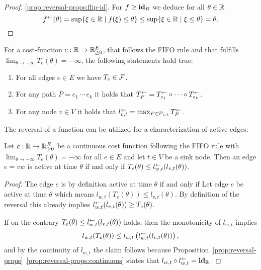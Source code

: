 \begin{proof}
    \ref{prop:reversal-props:flip-id}.
    For $f\geq \mathbf{id}_R$ we deduce for all $\theta\in\mathbb{R}$ \[
        f^{\leftarrow}(\theta) = \sup\{ \xi\in\mathbb{R} \mid f(\xi) \leq \theta \}
        \leq \sup\{\xi\in\mathbb{R} \mid \xi \leq \theta \} = \theta. \qedhere
    \]
\end{proof}

\begin{corollary}
    For a cost-function $c:\mathbb{R}\rightarrow\mathbb{R}_{\geq0}^E$, that follows the FIFO rule and that fulfills $\lim_{\theta\to-\infty} T_e(\theta) = -\infty$, the following statements hold true:
    \begin{enumerate}[label=(\roman*)]
        \item For all edges $e\in E$ we have $T_e \in \mathcal{F}$.
        \item\label{prop:reversal-props:paths} For any path $P=e_1\,\cdots \,e_k$ it holds that $T_P^{\leftarrow} = T_{e_1}^{\leftarrow} \circ \cdots \circ T_{e_k}^{\leftarrow}$.
        \item For any node $v\in V$ it holds that $l_{v,t}^{\leftarrow} = \max_{P\in\mathcal{P}_{v,t}} T_P^{\leftarrow}$.
    \end{enumerate}
\end{corollary}

The reversal of a function can be utilized for a characterization of active edges:

\begin{lemma}\label{lem:characterization-active-edges}
    Let $c: \mathbb{R}\rightarrow\mathbb{R}_{\geq0}^E$ be a continuous cost function following the FIFO rule with $\lim_{\theta\to-\infty} T_e(\theta) = -\infty$ for all $e\in E$ and let $t\in V$ be a sink node.
    Then an edge $e=vw$ is active at time $\theta$ if and only if $T_e(\theta) \leq l_{w,t}^{\leftarrow}( l_{v,t}(\theta) )$.
\end{lemma}
\begin{proof}
    The edge $e$ is by definition active at time $\theta$ if and only if 
    Let edge $e$ be active at time $\theta$ which means $l_{w,t}(T_e(\theta)) \leq l_{v,t}(\theta)$.
    By definition of the reversal this already implies $l_{w,t}^{\leftarrow}(l_{v,t}(\theta)) \geq T_e(\theta)$.

    If on the contrary $T_e(\theta) \leq l_{w,t}^{\leftarrow}( l_{v,t}(\theta) )$ holds, then the monotonicity of $l_{w,t}$ implies 
    \[
        l_{w,t}( T_e(\theta) ) \leq l_{w,t}\left(l_{w,t}^{\leftarrow}(l_{v,t}(\theta))\right),
    \]
    and by the continuity of $l_{w,t}$ the claim follows because Proposition~\ref{prop:reversal-props}~\ref{prop:reversal-props:continuous} states that $l_{w,t} \circ l_{w,t}^{\leftarrow} = \mathbf{id}_{\mathbb{R}}$. 
\end{proof}